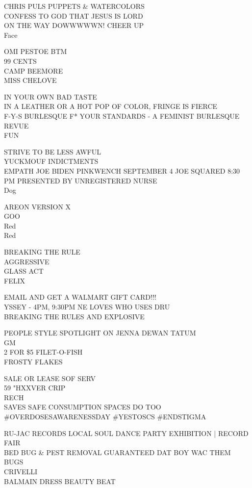 \documentclass[10pt,letterpaper]{article}
\begin{document}
CHRIS PULS PUPPETS \& WATERCOLORS\\
CONFESS TO GOD THAT JESUS IS LORD\\
ON THE WAY DOWWWWWN!  CHEER UP\\
Face

OMI PESTOE BTM\\
99 CENTS\\
CAMP BEEMORE\\
MISS CHELOVE

IN YOUR OWN BAD TASTE\\
IN A LEATHER OR A HOT POP OF COLOR, FRINGE IS FIERCE\\
F{-}Y{-}S BURLESQUE F* YOUR STANDARDS {-} A FEMINIST BURLESQUE REVUE\\
FUN

STRIVE TO BE LESS AWFUL\\
YUCKMOUF INDICTMENTS\\
EMPATH JOE BIDEN PINKWENCH SEPTEMBER 4 JOE SQUARED 8:30 PM PRESENTED BY UNREGISTERED NURSE\\
Dog

AREON VERSION X\\
GOO\\
Red\\
Red

BREAKING THE RULE\\
AGGRESSIVE\\
GLASS ACT\\
FELIX

EMAIL AND GET A WALMART GIFT CARD!!!\\
YSSEY {-} 4PM, 9:30PM NE LOVES WHO USES DRU\\
BREAKING THE RULES AND EXPLOSIVE

PEOPLE STYLE SPOTLIGHT ON JENNA DEWAN TATUM\\
GM\\
2 FOR \$5 FILET{-}O{-}FISH\\
FROSTY FLAKES

SALE OR LEASE SOF SERV\\
59 "HXXVER CRIP\\
RECH\\
SAVES SAFE CONSUMPTION SPACES DO TOO \#OVERDOSESAWARENESSDAY \#YESTOSCS \#ENDSTIGMA

RU{-}JAC RECORDS LOCAL SOUL DANCE PARTY EXHIBITION | RECORD FAIR\\
BED BUG \& PEST REMOVAL GUARANTEED DAT BOY WAC THEM BUGS\\
CRIVELLI\\
BALMAIN DRESS BEAUTY BEAT
\end{document}
